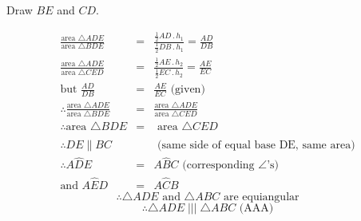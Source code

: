 \begin{schooltheorem}
{\begin{tabbing}
\>Draw $BE$ and $CD$. \end{tabbing}
\begin{eqnarray*}
\frac{\text{area }\triangle ADE}{\text{area }\triangle BDE} &=& \frac{\frac{1}{2}AD\,.\, h_1}{\frac{1}{2}DB\,.\, h_1} = \frac{AD}{DB}\\
\frac{\text{area }\triangle ADE}{\text{area }\triangle CED} &=& \frac{\frac{1}{2}AE\,.\, h_2}{\frac{1}{2}EC\,.\, h_2} = \frac{AE}{EC}\\
\text{but } \frac{AD}{DB} &=& \frac{AE}{EC} \text{    (given)}\\
\therefore \frac{\text{area }\triangle ADE}{\text{area }\triangle BDE} &=& \frac{\text{area }\triangle ADE}{\text{area }\triangle CED}\\
\therefore \text{area }\triangle BDE &=& \text{ area }\triangle CED\\
\\
\therefore DE \parallel BC & &\text{   (same side of equal base DE, same area)}\\
\therefore A\hat{D}E &=& A\hat{B}C  \text{   (corresponding $\angle$'s)}\\
\text{and } A\hat{E}D &=& A\hat{C}{B}
\end{eqnarray*}
$$\therefore \text{$\triangle ADE$ and $\triangle ABC$ are equiangular}$$
$$\therefore \triangle ADE \; ||| \; \triangle ABC \text{   (AAA)}$$

}
\end{schooltheorem}

